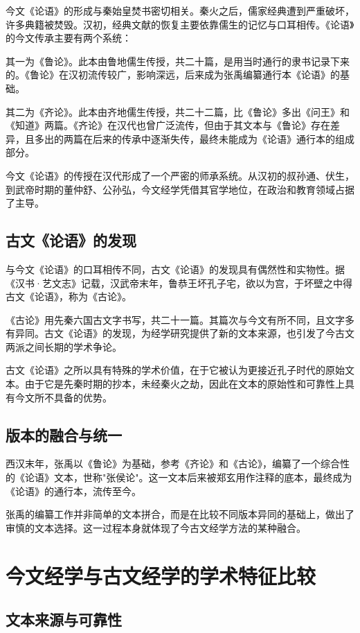 \documentclass[12pt,a4paper]{article}
\begin{document}
今文《论语》的形成与秦始皇焚书密切相关。秦火之后，儒家经典遭到严重破坏，许多典籍被焚毁。汉初，经典文献的恢复主要依靠儒生的记忆与口耳相传。《论语》的今文传承主要有两个系统：

其一为《鲁论》。此本由鲁地儒生传授，共二十篇，是用当时通行的隶书记录下来的。《鲁论》在汉初流传较广，影响深远，后来成为张禹编纂通行本《论语》的基础。

其二为《齐论》。此本由齐地儒生传授，共二十二篇，比《鲁论》多出《问王》和《知道》两篇。《齐论》在汉代也曾广泛流传，但由于其文本与《鲁论》存在差异，且多出的两篇在后来的传承中逐渐失传，最终未能成为《论语》通行本的组成部分。

今文《论语》的传授在汉代形成了一个严密的师承系统。从汉初的叔孙通、伏生，到武帝时期的董仲舒、公孙弘，今文经学凭借其官学地位，在政治和教育领域占据了主导。

\subsection{古文《论语》的发现}

与今文《论语》的口耳相传不同，古文《论语》的发现具有偶然性和实物性。据《汉书·艺文志》记载，汉武帝末年，鲁恭王坏孔子宅，欲以为宫，于坏壁之中得古文《论语》，称为《古论》。

《古论》用先秦六国古文字书写，共二十一篇。其篇次与今文有所不同，且文字多有异同。古文《论语》的发现，为经学研究提供了新的文本来源，也引发了今古文两派之间长期的学术争论。

古文《论语》之所以具有特殊的学术价值，在于它被认为更接近孔子时代的原始文本。由于它是先秦时期的抄本，未经秦火之劫，因此在文本的原始性和可靠性上具有今文所不具备的优势。

\subsection{版本的融合与统一}

西汉末年，张禹以《鲁论》为基础，参考《齐论》和《古论》，编纂了一个综合性的《论语》文本，世称"张侯论"。这一文本后来被郑玄用作注释的底本，最终成为《论语》的通行本，流传至今。

张禹的编纂工作并非简单的文本拼合，而是在比较不同版本异同的基础上，做出了审慎的文本选择。这一过程本身就体现了今古文经学方法的某种融合。

\section{今文经学与古文经学的学术特征比较}

\subsection{文本来源与可靠性}
\end{document}
